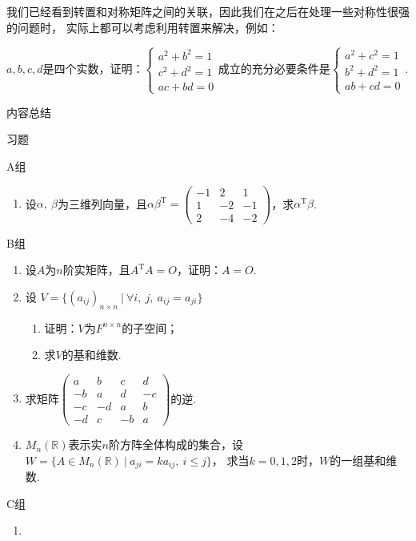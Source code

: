 我们已经看到转置和对称矩阵之间的关联，因此我们在之后在处理一些对称性很强的问题时，
实际上都可以考虑利用转置来解决，例如：
\begin{example}
    $a,b,c,d$是四个实数，证明：$\begin{cases}
		a^2+b^2=1 \\ c^2+d^2=1 \\ ac+bd=0
	\end{cases}$成立的充分必要条件是$\begin{cases}
		a^2+c^2=1 \\ b^2+d^2=1 \\ ab+cd=0
	\end{cases}$.
\end{example}
\begin{solution}

\end{solution}

\vspace{2ex}
\centerline{\heiti \Large 内容总结}

\vspace{2ex}

\centerline{\heiti \Large 习题}
\vspace{2ex}
{\kaishu }
\begin{flushright}
    \kaishu

\end{flushright}
\centerline{\heiti A组}
\begin{enumerate}
    \item 设$\alpha,\ \beta$为三维列向量，且$\alpha\beta^\mathrm{T}=
	\begin{pmatrix}-1 & 2 & 1 \\ 1 & -2 & -1 \\ 2 & -4 & -2\end{pmatrix}
	$，求$\alpha^\mathrm{T}\beta$.
\end{enumerate}
\centerline{\heiti B组}
\begin{enumerate}
    \item 设$A$为$n$阶实矩阵，且$A^\mathrm{T}A=O$，证明：$A=O$.
	\item 设 $V=\{(a_{ij})_{n \times n}\ |\ \forall i,\ j,\ a_{ij}=a_{ji}\}$
	\begin{enumerate}[label=(\arabic*)]
        \item 证明：$V$为$F^{n \times n}$的子空间；
        \item 求$V$的基和维数.
    \end{enumerate}
	\item 求矩阵$\begin{pmatrix}
		a & b & c & d \\ -b & a & d & -c \\ -c & -d & a & b \\ -d & c & -b & a
	\end{pmatrix}$的逆.
    \item $M_n(\mathbb{R})$表示实$n$阶方阵全体构成的集合，设$W=\{A\in M_n(\mathbb{R})\ |\ a_{ji}=ka_{ij},\ i \le j\}$，
	求当$k=0,1,2$时，$W$的一组基和维数.
\end{enumerate}
\centerline{\heiti C组}
\begin{enumerate}
    \item
\end{enumerate}
